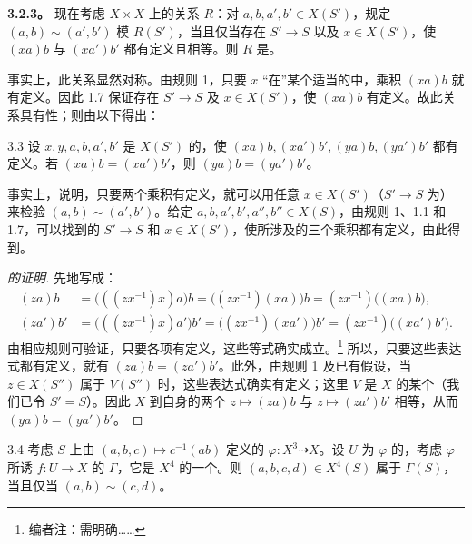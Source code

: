 \textbf{3.2.3。} 现在考虑 $X\times X$ 上的关系 $R$：对 $a,b,a',b'\in X(S')$，规定 $(a,b)\sim(a',b')$ 模 $R(S')$，当且仅当存在 $S'\to S$ 以及 $x\in X(S')$，使 $(xa)b$ 与 $(xa')b'$ 都有定义且相等。则 $R$ 是。

事实上，此关系显然对称。由规则 1，只要 $x$ “在”某个适当的中，乘积 $(xa)b$ 就有定义。因此 1.7 保证存在 $S'\to S$ 及 $x\in X(S')$，使 $(xa)b$ 有定义。故此关系具有性；则由以下得出：
\begin{SGAresult}{}{3.3}
设 $x,y,a,b,a',b'$ 是 $X(S')$ 的，使 $(xa)b,(xa')b',(ya)b,(ya')b'$ 都有定义。若 $(xa)b=(xa')b'$，则 $(ya)b=(ya')b'$。
\end{SGAresult}
事实上，说明，只要两个乘积有定义，就可以用任意 $x\in X(S')$（$S'\to S$ 为）来检验 $(a,b)\sim(a',b')$。给定 $a,b,a',b',a'',b''\in X(S)$，由规则 1、1.1 和 1.7，可以找到的 $S'\to S$ 和 $x\in X(S')$，使所涉及的三个乘积都有定义，由此得到。
\begin{proof}[的证明]
先地写成：
\[
\begin{aligned}
(za)b&=\bigl(((zx^{-1})x)a\bigr)b
 =\bigl((zx^{-1})(xa)\bigr)b=(zx^{-1})\bigl((xa)b\bigr),\\
(za')b'&=\bigl(((zx^{-1})x)a'\bigr)b'
 =\bigl((zx^{-1})(xa')\bigr)b'=(zx^{-1})\bigl((xa')b'\bigr).
\end{aligned}
\]
由相应规则可验证，只要各项有定义，这些等式确实成立。\footnote{编者注：需明确……} 所以，只要这些表达式都有定义，就有 $(za)b=(za')b'$。此外，由规则 1 及已有假设，当 $z\in X(S'')$ 属于 $V(S'')$ 时，这些表达式确实有定义；这里 $V$ 是 $X$ 的某个（我们已令 $S'=S$）。因此 $X$ 到自身的两个 $z\mapsto(za)b$ 与 $z\mapsto(za')b'$ 相等，从而 $(ya)b=(ya')b'$。
\end{proof}
\begin{SGAresult}{}{3.4}
考虑 $S$ 上由 $(a,b,c)\mapsto c^{-1}(ab)$ 定义的 $\varphi:X^3\dashrightarrow X$。设 $U$ 为 $\varphi$ 的，考虑 $\varphi$ 所诱 $f:U\to X$ 的 $\Gamma$，它是 $X^4$ 的一个。则 $(a,b,c,d)\in X^4(S)$ 属于 $\Gamma(S)$，当且仅当 $(a,b)\sim(c,d)$。
\end{SGAresult}
